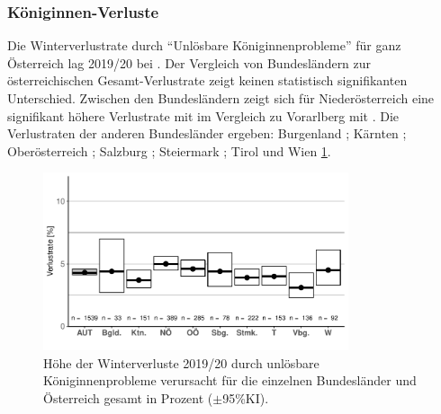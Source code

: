 

\subsubsection{Königinnen-Verluste}
\label{ss:koeniginnen_verluste:U}

Die Winterverlustrate durch \enquote{Unlösbare Königinnenprobleme} für ganz Österreich lag 2019/20 bei . Der Vergleich von Bundesländern zur österreichischen Gesamt-Verlustrate zeigt keinen statistisch signifikanten Unterschied. Zwischen den Bundesländern zeigt sich für Niederösterreich eine signifikant höhere Verlustrate mit  im Vergleich zu Vorarlberg mit .
\newline
Die Verlustraten der anderen Bundesländer ergeben: Burgenland ; Kärnten ; Oberösterreich ; Salzburg ; Steiermark ; Tirol  und Wien  \cref{fig:u:queen:states}.

\begin{figure}[H]
  \centering
  \includegraphics[keepaspectratio,width=0.8\textwidth]{project-U-wintersterblichkeit/figures/plot_queen_states}
  \caption{Höhe der Winterverluste 2019/20 durch unlösbare Königinnenprobleme verursacht für die einzelnen Bundesländer und Österreich gesamt in Prozent ($\pm$95\%KI).}
  \label{fig:u:queen:states}
\end{figure}

\label{ss:koeniginnen_probleme:U}

